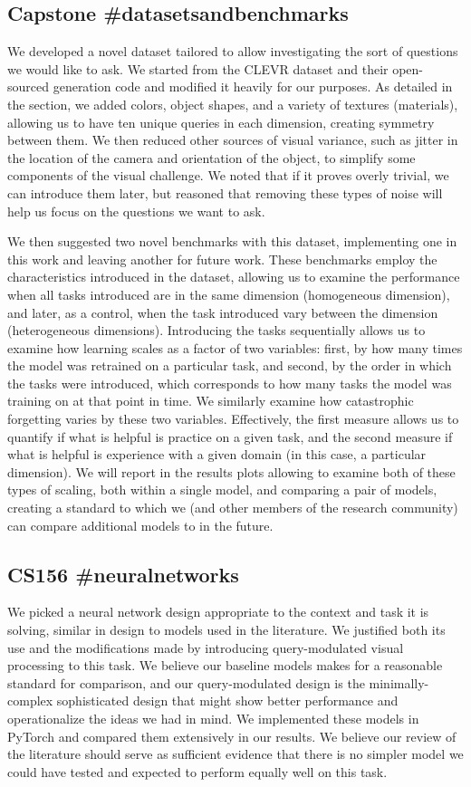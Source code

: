 \subsection{Capstone \#datasetsandbenchmarks}
We developed a novel dataset tailored to allow investigating the sort of questions we would like to ask. We started from the CLEVR dataset and their open-sourced generation code and modified it heavily for our purposes. As detailed in the section, we added colors, object shapes, and a variety of textures (materials), allowing us to have ten unique queries in each dimension, creating symmetry between them. We then reduced other sources of visual variance, such as jitter in the location of the camera and orientation of the object, to simplify some components of the visual challenge. We noted that if it proves overly trivial, we can introduce them later, but reasoned that removing these types of noise will help us focus on the questions we want to ask.

We then suggested two novel benchmarks with this dataset, implementing one in this work and leaving another for future work. These benchmarks employ the characteristics introduced in the dataset, allowing us to examine the performance when all tasks introduced are in the same dimension (homogeneous dimension), and later, as a control, when the task introduced vary between the dimension (heterogeneous dimensions). Introducing the tasks sequentially allows us to examine how learning scales as a factor of two variables: first, by how many times the model was retrained on a particular task, and second, by the order in which the tasks were introduced, which corresponds to how many tasks the model was training on at that point in time. We similarly examine how catastrophic forgetting varies by these two variables. Effectively, the first measure allows us to quantify if what is helpful is practice on a given task, and the second measure if what is helpful is experience with a given domain (in this case, a particular dimension). We will report in the results plots allowing to examine both of these types of scaling, both within a single model, and comparing a pair of models, creating a standard to which we (and other members of the research community) can compare additional models to in the future.

\subsection{CS156 \#neuralnetworks}
We picked a neural network design appropriate to the context and task it is solving, similar in design to models used in the literature. We justified both its use and the modifications made by introducing query-modulated visual processing to this task. We believe our baseline models makes for a reasonable standard for comparison, and our query-modulated design is the minimally-complex sophisticated design that might show better performance and operationalize the ideas we had in mind. We implemented these models in PyTorch and compared them extensively in our results. We believe our review of the literature should serve as sufficient evidence that there is no simpler model we could have tested and expected to perform equally well on this task. 

